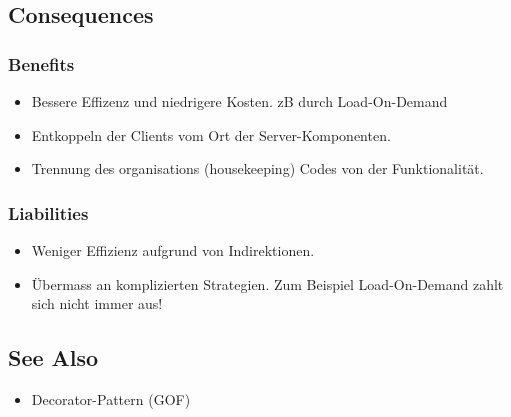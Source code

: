 \subsection*{Consequences}


\subsubsection*{Benefits}

\begin{itemize}
	\item Bessere Effizenz und niedrigere Kosten. zB durch Load-On-Demand
	\item Entkoppeln der Clients vom Ort der Server-Komponenten.
	\item Trennung des organisations (housekeeping) Codes von der Funktionalität.
\end{itemize}

\subsubsection*{Liabilities}


\begin{itemize}
	\item Weniger Effizienz aufgrund von Indirektionen.
	\item Übermass an komplizierten Strategien. Zum Beispiel Load-On-Demand zahlt sich nicht immer aus!
\end{itemize}

\subsection*{See Also}

\begin{itemize}
	\item Decorator-Pattern (GOF)
\end{itemize}